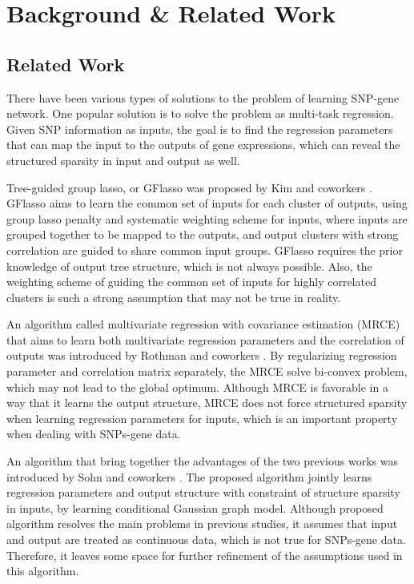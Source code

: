\documentclass{article}
\begin{document}
\section{Background \& Related Work}
\label{LiteratureReview}





\subsection{Related Work}

There have been various types of solutions to the problem of learning SNP-gene network. One popular solution is to solve the problem as multi-task regression.
Given SNP information as inputs, the goal is to find the regression parameters that can map the input to the outputs of gene expressions, which can reveal the structured sparsity in input and output as well.




Tree-guided group lasso, or GFlasso was proposed by Kim and coworkers \cite{kim2010tree}.
GFlasso aims to learn the common set of inputs for each cluster of outputs, using group lasso penalty and systematic weighting scheme for inputs, where inputs are grouped together to be mapped to the outputs, and output clusters with strong correlation are guided to share common input groups.
GFlasso requires the prior knowledge of output tree structure, which is not always possible.
Also, the weighting scheme of guiding the common set of inputs for highly correlated clusters is such a strong assumption that may not be true in reality.


An algorithm called multivariate regression with covariance estimation (MRCE) that aims to learn both multivariate regression parameters and the correlation of outputs was introduced by Rothman and coworkers \cite{rothman2010sparse}.
By regularizing regression parameter and correlation matrix separately, the MRCE solve bi-convex problem, which may not lead to the global optimum. Although MRCE is favorable in a way that it learns the output structure, MRCE does not force structured sparsity when learning regression parameters for inputs, which is an important property when dealing with SNPs-gene data.


An algorithm that bring together the advantages of the two previous works \cite{kim2010tree} \cite{rothman2010sparse} was introduced by Sohn and coworkers \cite{sohn2012joint}. 
The proposed algorithm jointly learns regression parameters and output structure with constraint of structure sparsity in inputs, by learning conditional Gaussian graph model.
Although proposed algorithm resolves the main problems in previous studies, it assumes that input and output are treated as continuous data, which is not true for SNPs-gene data.
Therefore, it leaves some space for further refinement of the assumptions used in this algorithm.
\end{document}
